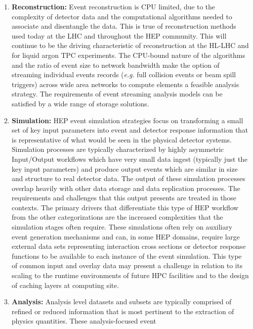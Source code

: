 \documentclass[12pt,a4paper]{article}
\begin{document}
\begin{enumerate}
\def\labelenumi{\arabic{enumi})}
\item \textbf{Reconstruction:} Event reconstruction is CPU limited, due to
  the complexity of detector data and the computational algorithms
  needed to associate and disentangle the data. This is true of
  reconstruction methods used today at the LHC and throughout the HEP
  community. This will continue to be the driving characteristic of
  reconstruction at the HL-LHC and for liquid argon TPC experiments. The
  CPU-bound nature of the algorithms and the ratio of event size to
  network bandwidth make the option of streaming individual events
  records (\emph{e.g.} full collision events or beam spill triggers)
  across wide area networks to compute elements a feasible analysis
  strategy. The requirements of event streaming analysis models can be
  satisfied by a wide range of storage solutions.
\item \textbf{Simulation:} HEP event simulation strategies focus on
  transforming a small set of key input parameters into event and
  detector response information that is representative of what would be
  seen in the physical detector systems. Simulation processes are
  typically characterized by highly asymmetric Input/Output workflows
  which have very small data ingest (typically just the key input
  parameters) and produce output events which are similar in size and
  structure to real detector data. The output of these simulation
  processes overlap heavily with other data storage and data replication
  processes. The requirements and challenges that this output presents
  are treated in those contexts. The primary drivers that differentiate
  this type of HEP workflow from the other categorizations are the
  increased complexities that the simulation stages often require. These
  simulations often rely on auxiliary event generation mechanisms and
  can, in some HEP domains, require large external data sets
  representing interaction cross sections or detector response functions
  to be available to each instance of the event simulation. This type of
  common input and overlay data may present a challenge in relation to
  its scaling to the runtime environments of future HPC facilities and
  to the design of caching layers at computing site.
\item \textbf{Analysis:} Analysis level datasets and subsets are typically
  comprised of refined or reduced information that is most pertinent to
  the extraction of physics quantities. These analysis-focused event

\end{enumerate}
\end{document}

